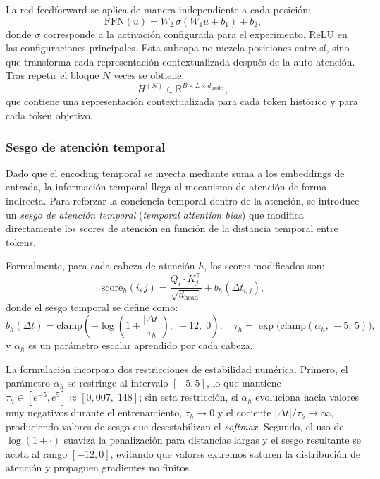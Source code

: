La red feedforward se aplica de manera independiente a cada posición:
\[
    \mathrm{FFN}(u)
    =
    W_2\,\sigma(W_1u+b_1)+b_2,
\]
donde $\sigma$ corresponde a la activación configurada para el experimento, ReLU en las configuraciones principales. Esta subcapa no mezcla posiciones entre sí, sino que transforma cada representación contextualizada después de la auto-atención. Tras repetir el bloque $N$ veces se obtiene:
\[
    H^{(N)} \in \mathbb{R}^{B \times L \times d_{\text{model}}},
\]
que contiene una representación contextualizada para cada token histórico y para cada token objetivo.

\subsubsection{Sesgo de atención temporal}
\label{sec:temporal-attention-bias}

Dado que el encoding temporal se inyecta mediante suma a los embeddings de entrada, la información temporal llega al mecanismo de atención de forma indirecta. Para reforzar la conciencia temporal dentro de la atención, se introduce un \emph{sesgo de atención temporal} (\emph{temporal attention bias}) que modifica directamente los scores de atención en función de la distancia temporal entre tokens.

Formalmente, para cada cabeza de atención $h$, los scores modificados son:
\[
    \text{score}_h(i, j) = \frac{Q_i \cdot K_j^\top}{\sqrt{d_{\text{head}}}} + b_h(\Delta t_{i,j}),
\]
donde el sesgo temporal se define como:
\[
    b_h(\Delta t) = \text{clamp}\!\left(-\log\left(1+\frac{|\Delta t|}{\tau_h}\right),\; -12,\; 0\right), \quad \tau_h = \exp\bigl(\text{clamp}(\alpha_h,\, -5,\, 5)\bigr),
\]
y $\alpha_h$ es un parámetro escalar aprendido por cada cabeza.

\hfill

La formulación incorpora dos restricciones de estabilidad numérica. Primero, el parámetro $\alpha_h$ se restringe al intervalo $[-5, 5]$, lo que mantiene $\tau_h \in [e^{-5}, e^{5}] \approx [0{,}007,\; 148]$; sin esta restricción, si $\alpha_h$ evoluciona hacia valores muy negativos durante el entrenamiento, $\tau_h \to 0$ y el cociente $|\Delta t|/\tau_h \to \infty$, produciendo valores de sesgo que desestabilizan el \emph{softmax}. Segundo, el uso de $\log(1+\cdot)$ suaviza la penalización para distancias largas y el sesgo resultante se acota al rango $[-12, 0]$, evitando que valores extremos saturen la distribución de atención y propaguen gradientes no finitos.

